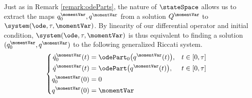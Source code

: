 \begin{remark}
  \label{remark:riccati-system}
  Just as in Remark \ref{remark:odeParts}, the nature of $\stateSpace$ allows us to extract the maps $q^\momentVar_0, q^\momentVar$ from a solution $Q^\momentVar$ to $\system(\ode,\tau,\momentVar)$.
  By linearity of our differential operator and initial condition, $\system(\ode,\tau,\momentVar)$ is thus equivalent to finding a solution $(q^\momentVar_0,q^\momentVar)$ to the following generalized Riccati system.
  \begin{align}
    \left\{\begin{aligned}
      \dot q^\momentVar_0(t) &= \odePart_0\big(q^\momentVar(t)\big), & t \in [0,\tau] \\
      \dot q^\momentVar(t) &= \odePart\big(q^\momentVar(t)\big), & t \in [0,\tau] \\
      q^\momentVar_0(0) &= 0 \\
      q^\momentVar(0) &= \momentVar
    \end{aligned}\right.
  \end{align}
\end{remark}
